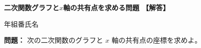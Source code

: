\documentclass[a4paper, 11pt]{jsarticle}
\begin{document}
\pagestyle{empty}

\begin{center}
    {\Large \textbf{二次関数\quad グラフと$x$軸の共有点を求める問題 {\color{red}【解答】}}}
\end{center}
\begin{flushright}
    年\hspace{1cm}組\hspace{1cm}番\hspace{1cm}氏名\hspace*{3.5cm}
\end{flushright}
\vspace{3mm}

\noindent\textbf{問題：} 次の二次関数のグラフと $x$ 軸の共有点の座標を求めよ。
\vspace{5mm}
\end{document}
